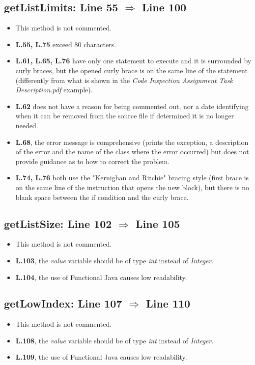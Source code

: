 \subsection{getListLimits: Line 55 $\Rightarrow$ Line 100}
\begin{itemize}
	\item This method is not commented.
	\item \textbf{L.55, L.75} exceed 80 characters.
	\item \textbf{L.61, L.65, L.76} have only one statement to execute and it is surrounded by curly braces, but the opened curly brace is on the same line of the statement (differently from what is shown in the \textit{Code Inspection Assignment Task Description.pdf} example).
	\item \textbf{L.62} does not have a reason for being commented out, nor a date identifying when it can be removed from the source file if determined it is no longer needed.
	\item \textbf{L.68}, the error message is comprehensive (prints the exception, a description of the error and the name of the class where the error occurred) but does not provide guidance as to how to correct the problem.
	\item \textbf{L.74, L.76} both use the "Kernighan and Ritchie" bracing style (first brace is on the same line of the instruction that opens the new block), but there is no blank space between the if condition and the curly brace.
\end{itemize}

\subsection{getListSize: Line 102 $\Rightarrow$ Line 105}
\begin{itemize}
	\item This method is not commented.
	\item \textbf{L.103}, the \textit{value} variable should be of type \textit{int} instead of \textit{Integer}.
	\item \textbf{L.104}, the use of Functional Java causes low readability.
\end{itemize}

\subsection{getLowIndex: Line 107 $\Rightarrow$ Line 110}
\begin{itemize}
	\item This method is not commented.
	\item \textbf{L.108}, the \textit{value} variable should be of type \textit{int} instead of \textit{Integer}.
	\item \textbf{L.109}, the use of Functional Java causes low readability.
\end{itemize}

